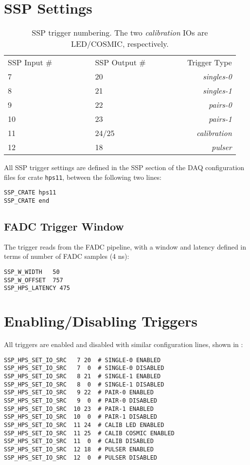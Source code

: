 \documentclass[amsmath,amssymb,notitlepage,11pt]{revtex4-1}
\begin{document}
\section{SSP Settings}
\begin{table}[htbp]\centering
  \begin{tabular}{llr}\toprule[1.5pt]
    SSP Input \#\ \ \ \ \ \ \ \ \  & SSP Output \# \ \ \ \ \ \ \ \ & Trigger Type \\ \cmidrule[0.5pt]{1-3}
    7 & 20 & {\em singles-0} \\
    8 & 21 & {\em singles-1} \\
    9 & 22 & {\em pairs-0} \\
    10 & 23 & {\em pairs-1} \\
    11 & 24/25& {\em calibration}\\
    12 & 18 & {\em pulser} \\
  \bottomrule[1.5pt]
  \end{tabular}
  \caption{SSP trigger numbering.  The two {\em calibration} IOs are LED/COSMIC, respectively. }
\end{table}

All SSP trigger settings are defined in the SSP section of the DAQ configuration files for crate \texttt{hps11}, between the following two lines:
\begin{verbatim}
SSP_CRATE hps11
SSP_CRATE end
\end{verbatim}

\subsection{FADC Trigger Window}
The trigger reads from the FADC pipeline, with a window and latency defined in terms of number of FADC samples (4 ns):
\begin{verbatim}
SSP_W_WIDTH   50
SSP_W_OFFSET  757
SSP_HPS_LATENCY 475
\end{verbatim}

\section{Enabling/Disabling Triggers}
All triggers are enabled and disabled with similar configuration lines, shown in :
\begin{verbatim}
SSP_HPS_SET_IO_SRC   7 20  # SINGLE-0 ENABLED
SSP_HPS_SET_IO_SRC   7  0  # SINGLE-0 DISABLED
SSP_HPS_SET_IO_SRC   8 21  # SINGLE-1 ENABLED
SSP_HPS_SET_IO_SRC   8  0  # SINGLE-1 DISABLED
SSP_HPS_SET_IO_SRC   9 22  # PAIR-0 ENABLED
SSP_HPS_SET_IO_SRC   9  0  # PAIR-0 DISABLED
SSP_HPS_SET_IO_SRC  10 23  # PAIR-1 ENABLED
SSP_HPS_SET_IO_SRC  10  0  # PAIR-1 DISABLED
SSP_HPS_SET_IO_SRC  11 24  # CALIB LED ENABLED
SSP_HPS_SET_IO_SRC  11 25  # CALIB COSMIC ENABLED
SSP_HPS_SET_IO_SRC  11  0  # CALIB DISABLED
SSP_HPS_SET_IO_SRC  12 18  # PULSER ENABLED
SSP_HPS_SET_IO_SRC  12  0  # PULSER DISABLED
\end{verbatim}
\end{document}

